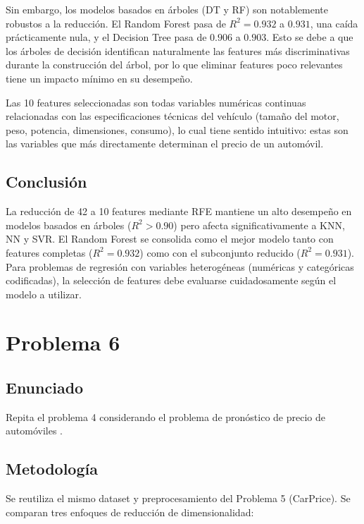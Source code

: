 \documentclass{article}
\begin{document}
Sin embargo, los modelos basados en árboles (DT y RF) son notablemente robustos a la reducción. El Random Forest pasa de $R^2 = 0.932$ a $0.931$, una caída prácticamente nula, y el Decision Tree pasa de $0.906$ a $0.903$. Esto se debe a que los árboles de decisión identifican naturalmente las features más discriminativas durante la construcción del árbol, por lo que eliminar features poco relevantes tiene un impacto mínimo en su desempeño.

Las 10 features seleccionadas son todas variables numéricas continuas relacionadas con las especificaciones técnicas del vehículo (tamaño del motor, peso, potencia, dimensiones, consumo), lo cual tiene sentido intuitivo: estas son las variables que más directamente determinan el precio de un automóvil.

\subsection{Conclusión}

La reducción de 42 a 10 features mediante RFE mantiene un alto desempeño en modelos basados en árboles ($R^2 > 0.90$) pero afecta significativamente a KNN, NN y SVR. El Random Forest se consolida como el mejor modelo tanto con features completas ($R^2 = 0.932$) como con el subconjunto reducido ($R^2 = 0.931$). Para problemas de regresión con variables heterogéneas (numéricas y categóricas codificadas), la selección de features debe evaluarse cuidadosamente según el modelo a utilizar.


\section{Problema 6}

\subsection{Enunciado}

Repita el problema 4 considerando el problema de pronóstico de precio de automóviles \cite{kaggleCarPricePrediction}.

\subsection{Metodología}

Se reutiliza el mismo dataset y preprocesamiento del Problema 5 (CarPrice). Se comparan tres enfoques de reducción de dimensionalidad:
\end{document}
